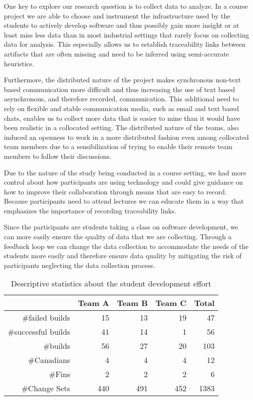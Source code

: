 One key to explore our research question is to collect data to analyze.
In a course project we are able to choose and instrument the infrastructure used by the students to actively develop software and thus possibly gain more insight or at least miss less data than in most industrial settings that rarely focus on collecting data for analysis.
This especially allows us to establish traceability links between artifacts that are often missing and need to be inferred using semi-accurate heuristics.

Furthermore, the distributed nature of the project makes synchronous non-text based communication more difficult and thus increasing the use of text based asynchronous, and therefore recorded, communication.
This additional need to rely on flexible and stable communication media, such as email and text based chats, enables us to collect more data that is easier to mine than it would have been realistic in a collocated setting.
The distributed nature of the teams, also induced an openness to work in a more distributed fashion even among collocated team members due to a sensibilization of trying to enable their remote team members to follow their discussions.

Due to the nature of the study being conducted in a course setting, we had more control about how participants are using technology and could give guidance on how to improve their collaboration through means that are easy to record.
Because participants need to attend lectures we can educate them in a way that emphasizes the importance of recording traceability links.

Since the participants are students taking a class on software development, we can more easily ensure the quality of data that we are collecting.
Through a feedback loop we can change the data collection to accommodate the needs of the students more easily and therefore ensure data quality by mitigating the risk of participants neglecting the data collection process. 

\begin{table}[t]
\centering
\caption{Descriptive statistics about the student development effort}
\begin{tabular}{rrrrr}
\toprule
& Team A & Team B & Team C & Total\\
\midrule
\#failed builds &15&13&19&47\\
\#successful builds &41&14&1&56\\ 
\#builds & 56 & 27 & 20 & 103 \\
\#Canadians & 4 & 4 & 4 & 12\\
\#Fins & 2 & 2 & 2 & 6\\
\#Change Sets & 440 & 491 &  452& 1383\\
\bottomrule
\end{tabular}
\label{tab:gsd:desc:stats}
\end{table}

